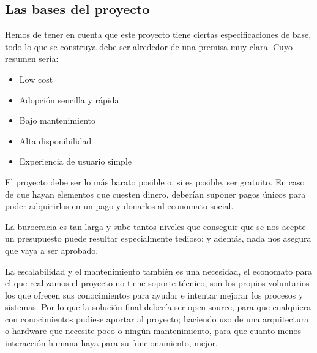 \subsection{Las bases del proyecto}
Hemos de tener en cuenta que este proyecto tiene ciertas especificaciones de base, todo lo que se construya debe ser alrededor de una premisa muy clara. Cuyo resumen sería:
\begin{itemize}
    \item Low cost
    \item Adopción sencilla y rápida
    \item Bajo mantenimiento
    \item Alta disponibilidad
    \item Experiencia de usuario simple
\end{itemize}
El proyecto debe ser lo más barato posible o, si es posible, ser gratuito. En caso de que hayan elementos que cuesten dinero, deberían suponer pagos únicos para poder adquirirlos en un pago y donarlos al economato social.
\vspace{1em}
\par La burocracia es tan larga y sube tantos niveles que conseguir que se nos acepte un presupuesto puede resultar especialmente tedioso; y además, nada nos asegura que vaya a ser aprobado.
\vspace{1em}
\par La escalabilidad y el mantenimiento también es una necesidad, el economato para el que realizamos el proyecto no tiene soporte técnico, son los propios voluntarios los que ofrecen sus conocimientos para ayudar e intentar mejorar los procesos y sistemas. Por lo que la solución final debería ser open source, para que cualquiera con conocimientos pudiese aportar al proyecto; haciendo uso de una arquitectura o hardware que necesite poco o ningún mantenimiento, para que cuanto menos interacción humana haya para su funcionamiento, mejor.
\clearpage
